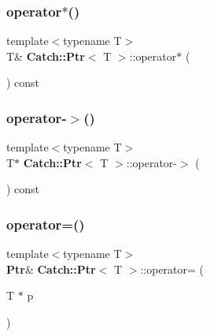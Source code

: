 \mbox{\label{class_catch_1_1_ptr_a8d73989b1c77a1cab6152766feaa837f}} 
\subsubsection{operator$\ast$()}
{\footnotesize\ttfamily template$<$typename T$>$ \\
T\& \textbf{ Catch\+::\+Ptr}$<$ T $>$\+::operator$\ast$ (\begin{DoxyParamCaption}{ }\end{DoxyParamCaption}) const\hspace{0.3cm}{\ttfamily [inline]}}

\mbox{\label{class_catch_1_1_ptr_acc0996cbd99f360069260a898b3f4fda}} 
\subsubsection{operator-\/$>$()}
{\footnotesize\ttfamily template$<$typename T$>$ \\
T$\ast$ \textbf{ Catch\+::\+Ptr}$<$ T $>$\+::operator-\/$>$ (\begin{DoxyParamCaption}{ }\end{DoxyParamCaption}) const\hspace{0.3cm}{\ttfamily [inline]}}

\mbox{\label{class_catch_1_1_ptr_a9b08c868b447d679ed201921f5c94683}} 
\subsubsection{operator=()\hspace{0.1cm}{\footnotesize\ttfamily [1/2]}}
{\footnotesize\ttfamily template$<$typename T$>$ \\
\textbf{ Ptr}\& \textbf{ Catch\+::\+Ptr}$<$ T $>$\+::operator= (\begin{DoxyParamCaption}\item[{T $\ast$}]{p }\end{DoxyParamCaption})\hspace{0.3cm}{\ttfamily [inline]}}

\mbox{\label{class_catch_1_1_ptr_af42074444c1bc6a70ebdc406a8617708}} 
